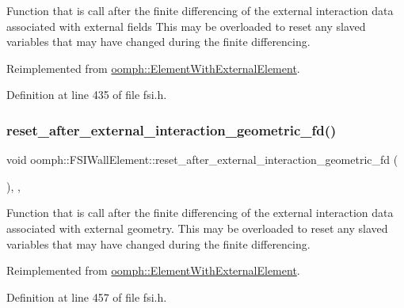 Function that is call after the finite differencing of the external interaction data associated with external fields This may be overloaded to reset any slaved variables that may have changed during the finite differencing. 



Reimplemented from \hyperlink{classoomph_1_1ElementWithExternalElement_a3852c0042b81305b0488fc67f37ad632}{oomph\+::\+Element\+With\+External\+Element}.



Definition at line 435 of file fsi.\+h.

\mbox{\label{classoomph_1_1FSIWallElement_ad1d147ea9d6f49f7d0507d783d7572e2}} 
\subsubsection{\texorpdfstring{reset\+\_\+after\+\_\+external\+\_\+interaction\+\_\+geometric\+\_\+fd()}{reset\_after\_external\_interaction\_geometric\_fd()}}
{\footnotesize\ttfamily void oomph\+::\+F\+S\+I\+Wall\+Element\+::reset\+\_\+after\+\_\+external\+\_\+interaction\+\_\+geometric\+\_\+fd (\begin{DoxyParamCaption}{ }\end{DoxyParamCaption})\hspace{0.3cm}{\ttfamily [inline]}, {\ttfamily [protected]}, {\ttfamily [virtual]}}



Function that is call after the finite differencing of the external interaction data associated with external geometry. This may be overloaded to reset any slaved variables that may have changed during the finite differencing. 



Reimplemented from \hyperlink{classoomph_1_1ElementWithExternalElement_a902a29b3e23a6fb6a6b06e672162a578}{oomph\+::\+Element\+With\+External\+Element}.



Definition at line 457 of file fsi.\+h.

